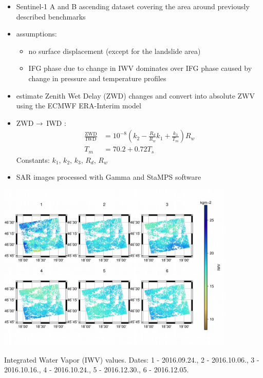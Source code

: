 \documentclass{beamer}
\begin{document}
\begin{frame}{\ft}
    \begin{itemize}
        \item Sentinel-1 A and B ascending dataset covering the area around previously described benchmarks
        \item assumptions:
        \begin{itemize}
            \item no surface displacement (except for the landslide area)
            \item IFG phase due to change in IWV dominates over IFG phase caused by change in pressure and temperature profiles
        \end{itemize}
        \item estimate Zenith Wet Delay (ZWD) changes and convert into absolute ZWV using the ECMWF ERA-Interim model \cite{ERA_I}
        \item ZWD $\rightarrow$ IWD \cite{saastamoinen1972atmospheric}:
        \begin{align*}
            \frac{\mathrm{ZWD}}{\mathrm{IWD}} &= 10^{-8} \left(k_2 - \frac{R_d}{R_w} k_1 + \frac{k_3}{T_m} \right) R_w \\
            T_m &= 70.2 + 0.72 T_s
        \end{align*}
        Constants: $k_1$, $k_2$, $k_3$, $R_d$, $R_w$ \cite{thayer1974improved, smith1953constants, hopfield1969two}
        \item SAR images processed with Gamma and StaMPS software
    \end{itemize}    
\end{frame}


\begin{frame}{\ft}
    \begin{center}
        \includegraphics[width=0.85\textwidth]{iwv.png}
        \vspace{-20pt}
        
        {\small Integrated Water Vapor (IWV) values. Dates:  1 - 2016.09.24., 2 - 2016.10.06., 3 - 2016.10.16., 4 - 2016.10.24., 5 - 2016.12.30., 6 - 2016.12.05.}
    \end{center}
\end{frame}
\end{document}
